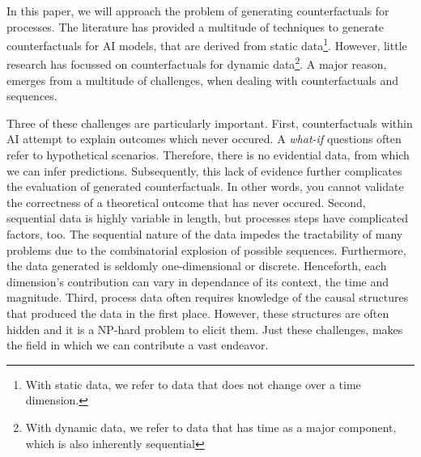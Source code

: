 \documentclass[./../../paper.tex]{subfiles}
\begin{document}
In this paper, we will approach the problem of generating counterfactuals for processes. The literature has provided a multitude of techniques to generate counterfactuals for AI models, that are derived from static data\footnote{With static data, we refer to data that does not change over a time dimension.}. However, little research has focussed on counterfactuals for dynamic data\footnote{With dynamic data, we refer to data that has time as a major component, which is also inherently sequential}. A major reason, emerges from a multitude of challenges, when dealing with counterfactuals and sequences. 

Three of these challenges are particularly important. First, counterfactuals within AI attempt to explain outcomes which never occured. A \emph{what-if} questions often refer to hypothetical scenarios. Therefore, there is no evidential data, from which we can infer predictions. Subsequently, this lack of evidence further complicates the evaluation of generated counterfactuals. In other words, you cannot validate the correctness of a theoretical outcome that has never occured.
Second, sequential data is highly variable in length, but processes steps have complicated factors, too\needscite{}. The sequential nature of the data impedes the tractability of many problems due to the combinatorial explosion of possible sequences. Furthermore, the data generated is seldomly one-dimensional or discrete. Henceforth, each dimension's contribution can vary in dependance of its context, the time and magnitude.
Third, process data often requires knowledge of the causal structures that produced the data in the first place. However, these structures are often hidden and it is a NP-hard problem to elicit them. 
Just these challenges, makes the field in which we can contribute a vast endeavor. 
\end{document}
